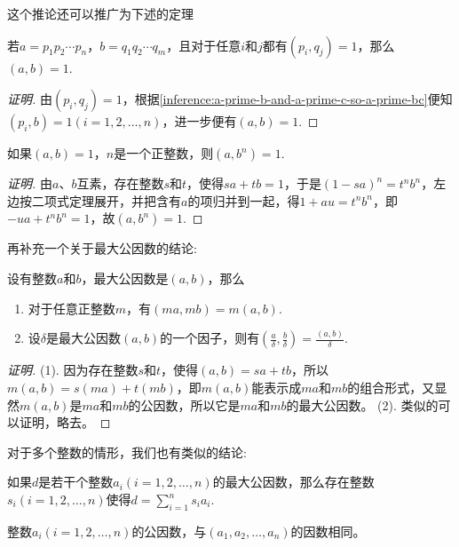 这个推论还可以推广为下述的定理
\begin{theorem}
  \label{theorem:two-group-prime-without-repeat-prime-each-other}
  若$a=p_1p_2 \cdots p_n$，$b=q_1q_2 \cdots q_m$，且对于任意$i$和$j$都有$(p_i,q_j)=1$，那么$(a,b)=1$.
\end{theorem}

\begin{proof}[证明]
 由$(p_i,q_j)=1$，根据\autoref{inference:a-prime-b-and-a-prime-c-so-a-prime-bc}便知$(p_i, b)=1(i=1,2,\ldots,n)$，进一步便有$(a,b)=1$.
\end{proof}

\begin{theorem}
  如果$(a,b)=1$，$n$是一个正整数，则$(a,b^n)=1$.
\end{theorem}

\begin{proof}[证明]
  由$a$、$b$互素，存在整数$s$和$t$，使得$sa+tb=1$，于是$(1-sa)^n=t^nb^n$，左边按二项式定理展开，并把含有$a$的项归并到一起，得$1+au=t^nb^n$，即$-ua+t^nb^n=1$，故$(a,b^n)=1$.
\end{proof}

再补充一个关于最大公因数的结论:
\begin{theorem}
  设有整数$a$和$b$，最大公因数是$(a,b)$，那么
  \begin{enumerate}
  \item 对于任意正整数$m$，有$(ma, mb)=m(a,b)$.
  \item 设$\delta$是最大公因数$(a,b)$的一个因子，则有$(\frac{a}{\delta}, \frac{b}{\delta})=\frac{(a,b)}{\delta}$.
  \end{enumerate}
\end{theorem}

\begin{proof}[证明]
  (1). 因为存在整数$s$和$t$，使得$(a,b)=sa+tb$，所以$m(a,b)=s(ma)+t(mb)$，即$m(a,b)$能表示成$ma$和$mb$的组合形式，又显然$m(a,b)$是$ma$和$mb$的公因数，所以它是$ma$和$mb$的最大公因数。
  (2). 类似的可以证明，略去。
\end{proof}

对于多个整数的情形，我们也有类似的结论:
\begin{theorem}
  如果$d$是若干个整数$a_i(i=1,2,\ldots,n)$的最大公因数，那么存在整数$s_i(i=1,2,\ldots,n)$使得$d=\sum_{i=1}^n s_ia_i$.
\end{theorem}

\begin{inference}
  整数$a_i(i=1,2,\ldots,n)$的公因数，与$(a_1,a_2,\ldots,a_n)$的因数相同。
\end{inference}


